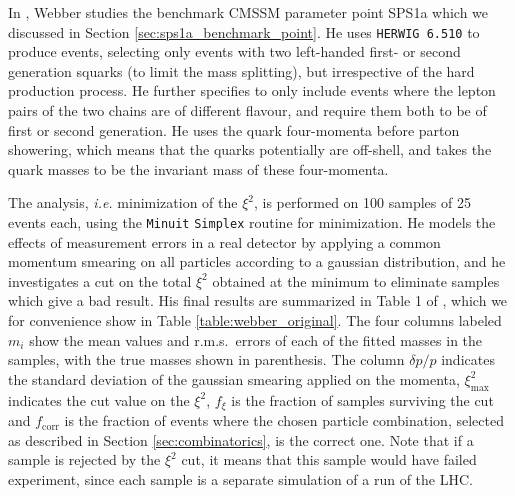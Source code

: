 \documentclass[twoside,english]{uiofysmaster}
\begin{document}
In \cite{Webber:2009vm}, Webber studies the benchmark CMSSM parameter point SPS1a \cite{Allanach:2002nj} which we discussed in Section \ref{sec:sps1a_benchmark_point}. He uses {\tt HERWIG 6.510} \cite{Corcella:2000bw,Moretti:2002eu} to produce events, selecting only events with two left-handed first- or second generation squarks (to limit the mass splitting), but irrespective of the hard production process. He further specifies to only include events where the lepton pairs of the two chains are of different flavour, and require them both to be of first or second generation. He uses the quark four-momenta before parton showering, which means that the quarks potentially are off-shell, and takes the quark masses to be the invariant mass of these four-momenta.

The analysis, {\it i.e.} minimization of the $\xi^2$, is performed on 100 samples of 25 events each, using the {\tt Minuit} \cite{James:1975dr} {\tt Simplex}  routine for minimization. He models the effects of measurement errors in a real detector by applying a common momentum smearing on all particles according to a gaussian distribution, and he investigates a cut on the total $\xi^2$ obtained at the minimum to eliminate samples which give a bad result. His final results are summarized in Table 1 of \cite{Webber:2009vm}, which we for convenience show in Table \ref{table:webber_original}. The four columns labeled $m_i$ show the mean values and r.m.s.\ errors of each of the fitted masses in the samples, with the true masses shown in parenthesis. The column $\delta p/p$ indicates the standard deviation of the gaussian smearing applied on the momenta, $\xi^2_\mathrm{max}$ indicates the cut value on the $\xi^2$, $f_\xi$ is the fraction of samples surviving the cut and $f_\mathrm{corr}$ is the fraction of events where the chosen particle combination, selected as described in Section \ref{sec:combinatorics}, is the correct one. Note that if a sample is rejected by the $\xi^2$ cut, it means that this sample would have failed experiment, since each sample is a separate simulation of a run of the LHC.
\end{document}
